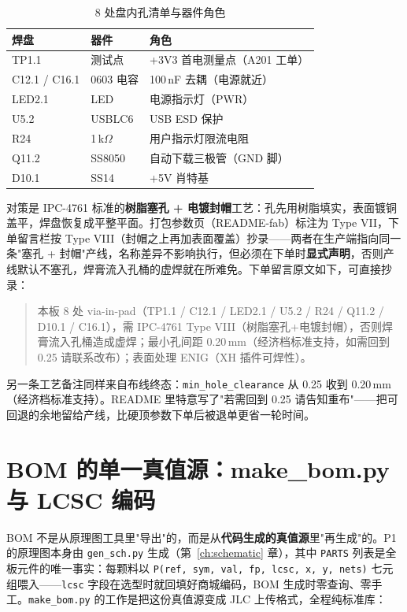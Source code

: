 \begin{table}[htbp]
  \centering
  \caption{8 处盘内孔清单与器件角色}
  \label{tab:fab-vip}
  \begin{tabular}{llp{5.2cm}}
    \toprule
    焊盘 & 器件 & 角色 \\
    \midrule
    TP1.1 & 测试点 & +3V3 首电测量点（A201 工单） \\
    C12.1 / C16.1 & 0603 电容 & 100\,nF 去耦（电源就近） \\
    LED2.1 & LED & 电源指示灯（PWR） \\
    U5.2 & USBLC6 & USB ESD 保护 \\
    R24 & 1\,k$\Omega$ & 用户指示灯限流电阻 \\
    Q11.2 & SS8050 & 自动下载三极管（GND 脚） \\
    D10.1 & SS14 & +5V 肖特基 \\
    \bottomrule
  \end{tabular}
\end{table}

对策是 IPC-4761 标准的\textbf{树脂塞孔 + 电镀封帽}工艺：孔先用树脂填实，表面镀铜盖平，焊盘恢复成平整平面。打包参数页（README-fab）标注为 Type VII，下单留言栏按 Type VIII（封帽之上再加表面覆盖）抄录——两者在生产端指向同一条"塞孔 + 封帽"产线，名称差异不影响执行，但必须在下单时\textbf{显式声明}，否则产线默认不塞孔，焊膏流入孔桶的虚焊就在所难免。下单留言原文如下，可直接抄录：

\begin{quote}\small
本板 8 处 via-in-pad（TP1.1 / C12.1 / LED2.1 / U5.2 / R24 / Q11.2 / D10.1 / C16.1），需 IPC-4761 Type VIII（树脂塞孔+电镀封帽），否则焊膏流入孔桶造成虚焊；最小孔间距 0.20\,mm（经济档标准支持，如需回到 0.25 请联系改布）；表面处理 ENIG（XH 插件可焊性）。
\end{quote}

另一条工艺备注同样来自布线终态：\texttt{min\_hole\_clearance} 从 0.25 收到 0.20\,mm（经济档标准支持）。README 里特意写了"若需回到 0.25 请告知重布"——把可回退的余地留给产线，比硬顶参数下单后被退单更省一轮时间。

\section{BOM 的单一真值源：make\_bom.py 与 LCSC 编码}
\label{sec:fab-bom}

BOM 不是从原理图工具里"导出"的，而是从\textbf{代码生成的真值源}里"再生成"的。P1 的原理图本身由 \texttt{gen\_sch.py} 生成（第~\ref{ch:schematic} 章），其中 \texttt{PARTS} 列表是全板元件的唯一事实：每颗料以 \texttt{P(ref, sym, val, fp, lcsc, x, y, nets)} 七元组喂入——\texttt{lcsc} 字段在选型时就回填好商城编码，BOM 生成时零查询、零手工。\texttt{make\_bom.py} 的工作是把这份真值源变成 JLC 上传格式，全程纯标准库：

